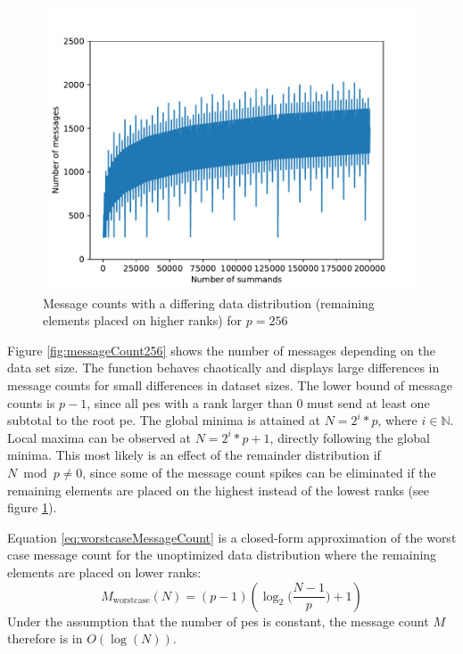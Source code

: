 \begin{figure}
\centering
\includegraphics[scale=0.7]{figures/message_count_256_remainder_at_end.pdf}
\caption{Message counts with a differing data distribution (remaining elements placed on higher ranks) for $p=256$}
\label{fig:messageCount256RemainderAtEnd}
\end{figure}

Figure \ref{fig:messageCount256} shows the number of messages depending on the data set size.
The function behaves chaotically and displays large differences in message counts for small differences in dataset sizes.
The lower bound of message counts is $p - 1$, since all \glspl{pe} with a rank larger than $0$ must send at least one subtotal to the root \gls{pe}.
The global minima is attained at $N = 2^i * p$, where $i \in \mathbb{N}$.
Local maxima can be observed at $N = 2^i * p + 1$, directly following the global minima.
This most likely is an effect of the remainder distribution if $N \bmod p \neq 0$, since some of the message count spikes can be eliminated if the remaining elements are placed on the highest instead of the lowest ranks (see figure \ref{fig:messageCount256RemainderAtEnd}).

Equation \eqref{eq:worstcaseMessageCount} is a closed-form approximation of the worst case message count for the unoptimized data distribution where the remaining elements are placed on lower ranks:
\begin{equation}
\label{eq:worstcaseMessageCount}
M_{\textrm{worstcase}}(N) = (p - 1) (\log_2 \Big( \frac{N - 1}{p} \Big) + 1)
\end{equation}
Under the assumption that the number of \glspl{pe} is constant, the message count $M$ therefore is in $O(\log(N))$.